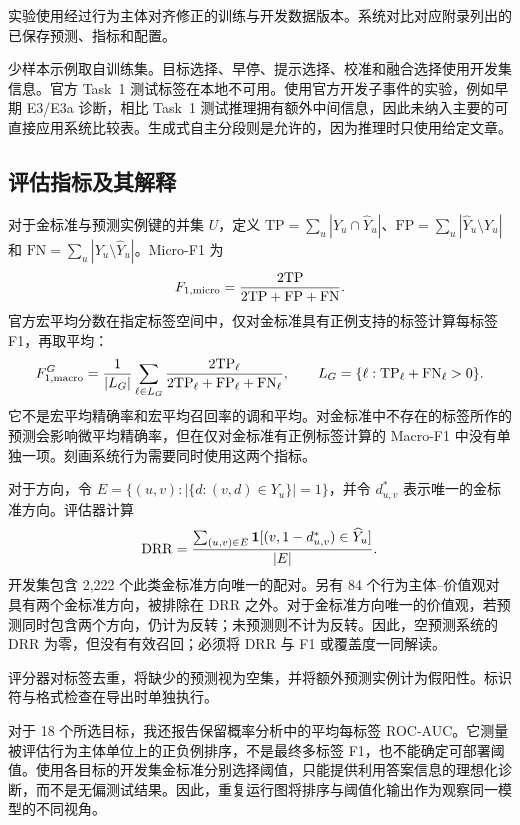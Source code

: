 \documentclass[12pt,a4paper]{article}
\begin{document}
实验使用经过行为主体对齐修正的训练与开发数据版本。系统对比对应附录列出的已保存预测、指标和配置。

少样本示例取自训练集。目标选择、早停、提示选择、校准和融合选择使用开发集信息。官方 Task~1 测试标签在本地不可用。使用官方开发子事件的实验，例如早期 E3/E3a 诊断，相比 Task~1 测试推理拥有额外中间信息，因此未纳入主要的可直接应用系统比较表。生成式自主分段则是允许的，因为推理时只使用给定文章。

\subsection{评估指标及其解释}
对于金标准与预测实例键的并集 $U$，定义 $\mathrm{TP}=\sum_u|Y_u\cap\widehat{Y}_u|$、$\mathrm{FP}=\sum_u|\widehat{Y}_u\setminus Y_u|$ 和 $\mathrm{FN}=\sum_u|Y_u\setminus\widehat{Y}_u|$。Micro-F1 为
\begin{equation}
\micro=\frac{2\mathrm{TP}}{2\mathrm{TP}+\mathrm{FP}+\mathrm{FN}}.
\label{eq:micro}
\end{equation}
官方宏平均分数在指定标签空间中，仅对金标准具有正例支持的标签计算每标签 F1，再取平均：
\begin{equation}
\macro=\frac{1}{|L_G|}\sum_{\ell\in L_G}
\frac{2\mathrm{TP}_\ell}{2\mathrm{TP}_\ell+\mathrm{FP}_\ell+\mathrm{FN}_\ell},
\qquad L_G=\{\ell:\mathrm{TP}_\ell+\mathrm{FN}_\ell>0\}.
\label{eq:macro}
\end{equation}
它不是宏平均精确率和宏平均召回率的调和平均。对金标准中不存在的标签所作的预测会影响微平均精确率，但在仅对金标准有正例标签计算的 Macro-F1 中没有单独一项。刻画系统行为需要同时使用这两个指标。

对于方向，令 $E=\{(u,v):|\{d:(v,d)\in Y_u\}|=1\}$，并令 $d^*_{u,v}$ 表示唯一的金标准方向。评估器计算
\begin{equation}
\drr=\frac{\sum_{(u,v)\in E}\mathbf{1}[(v,1-d^*_{u,v})\in\widehat{Y}_u]}{|E|}.
\label{eq:drr}
\end{equation}
开发集包含 2,222 个此类金标准方向唯一的配对。另有 84 个行为主体--价值观对具有两个金标准方向，被排除在 DRR 之外。对于金标准方向唯一的价值观，若预测同时包含两个方向，仍计为反转；未预测则不计为反转。因此，空预测系统的 DRR 为零，但没有有效召回；必须将 DRR 与 F1 或覆盖度一同解读。

评分器对标签去重，将缺少的预测视为空集，并将额外预测实例计为假阳性。标识符与格式检查在导出时单独执行。

对于 18 个所选目标，我还报告保留概率分析中的平均每标签 ROC-AUC。它测量被评估行为主体单位上的正负例排序，不是最终多标签 F1，也不能确定可部署阈值。使用各目标的开发集金标准分别选择阈值，只能提供利用答案信息的理想化诊断，而不是无偏测试结果。因此，重复运行图将排序与阈值化输出作为观察同一模型的不同视角。
\end{document}
